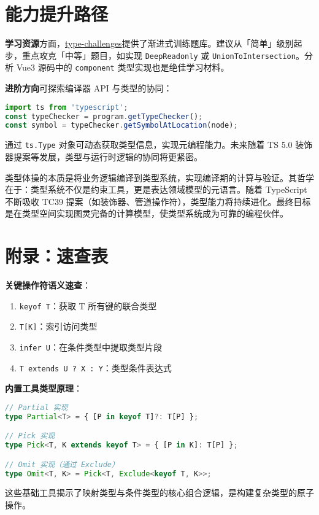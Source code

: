 \chapter{能力提升路径}
\textbf{学习资源}方面，\href{https://github.com/type-challenges/type-challenges}{type-challenges}提供了渐进式训练题库。建议从「简单」级别起步，重点攻克「中等」题目，如实现 \texttt{DeepReadonly} 或 \texttt{UnionToIntersection}。分析 Vue3 源码中的 \texttt{component} 类型实现也是绝佳学习材料。\par
\textbf{进阶方向}可探索编译器 API 与类型的协同：\par
\begin{lstlisting}[language=typescript]
import ts from 'typescript';
const typeChecker = program.getTypeChecker();
const symbol = typeChecker.getSymbolAtLocation(node);
\end{lstlisting}
通过 \texttt{ts.Type} 对象可动态获取类型信息，实现元编程能力。未来随着 TS 5.0 装饰器提案等发展，类型与运行时逻辑的协同将更紧密。\par
类型体操的本质是将业务逻辑编译到类型系统，实现编译期的计算与验证。其哲学在于：类型系统不仅是约束工具，更是表达领域模型的元语言。随着 TypeScript 不断吸收 TC39 提案（如装饰器、管道操作符），类型能力将持续进化。最终目标是在类型空间实现图灵完备的计算模型，使类型系统成为可靠的编程伙伴。\par
\chapter{附录：速查表}
\textbf{关键操作符语义速查}：\par
\begin{enumerate}
\item \texttt{keyof T}：获取 T 所有键的联合类型
\item \texttt{T[K]}：索引访问类型
\item \texttt{infer U}：在条件类型中提取类型片段
\item \texttt{T extends U ? X : Y}：类型条件表达式
\end{enumerate}
\textbf{内置工具类型原理}：\par
\begin{lstlisting}[language=typescript]
// Partial 实现
type Partial<T> = { [P in keyof T]?: T[P] };

// Pick 实现
type Pick<T, K extends keyof T> = { [P in K]: T[P] };

// Omit 实现（通过 Exclude）
type Omit<T, K> = Pick<T, Exclude<keyof T, K>>;
\end{lstlisting}
这些基础工具揭示了映射类型与条件类型的核心组合逻辑，是构建复杂类型的原子操作。\par

